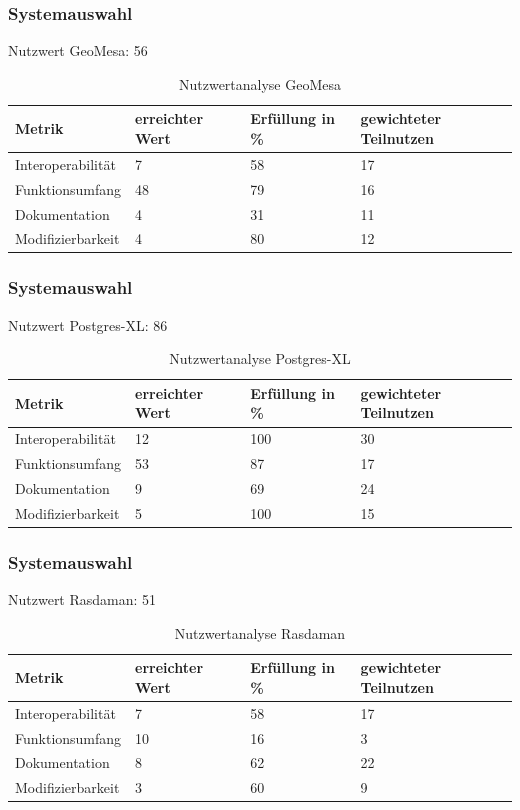 \documentclass{beamer}
\begin{document}
\begin{frame}\frametitle{Systemauswahl}
Nutzwert GeoMesa: 56
\begin{table}
\begin{tabular}{|l|p{1.8cm}|l|p{1.9cm}|}
\hline
\textbf{Metrik} & \textbf{erreichter Wert} & \textbf{Erfüllung in \%} & \textbf{gewichteter Teilnutzen} \\ \hline
Interoperabilität & 7 & 58 & 17 \\ \hline
Funktionsumfang & 48 & 79 & 16 \\ \hline
Dokumentation & 4 & 31 & 11 \\ \hline
Modifizierbarkeit & 4 & 80 & 12 \\ \hline
\end{tabular}
\caption{Nutzwertanalyse GeoMesa}
\end{table}
\end{frame}

\begin{frame}\frametitle{Systemauswahl}
Nutzwert Postgres-XL: 86
\begin{table}
\begin{tabular}{|l|p{1.8cm}|l|p{1.9cm}|}
\hline
\textbf{Metrik} & \textbf{erreichter Wert} & \textbf{Erfüllung in \%} & \textbf{gewichteter Teilnutzen} \\ \hline
Interoperabilität & 12 & 100 & 30 \\ \hline
Funktionsumfang & 53 & 87 & 17 \\ \hline
Dokumentation & 9 & 69 & 24 \\ \hline
Modifizierbarkeit & 5 & 100 & 15 \\ \hline
\end{tabular}
\caption{Nutzwertanalyse Postgres-XL}
\end{table}
\end{frame}

\begin{frame}\frametitle{Systemauswahl}
Nutzwert Rasdaman: 51
\begin{table}
\begin{tabular}{|l|p{1.8cm}|l|p{1.9cm}|}
\hline
\textbf{Metrik} & \textbf{erreichter Wert} & \textbf{Erfüllung in \%} & \textbf{gewichteter Teilnutzen} \\ \hline
Interoperabilität & 7 & 58 & 17 \\ \hline
Funktionsumfang & 10 & 16 & 3 \\ \hline
Dokumentation & 8 & 62 & 22 \\ \hline
Modifizierbarkeit & 3 & 60 & 9 \\ \hline
\end{tabular}
\caption{Nutzwertanalyse Rasdaman}
\end{table}
\end{frame}
\end{document}
